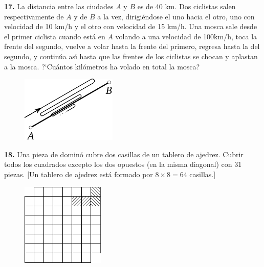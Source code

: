 \documentclass[12pt]{article}  %
\begin{document}
{\bf 17.} La distancia entre las ciudades $A$ y $B$ es de 40 km. Dos ciclistas salen respectivamente de $A$ y de $B$ 
a la vez, dirigi\'endose el uno hacia el otro, uno con velocidad de 10 km/h y el otro con velocidad de 15 km/h. 
Una mosca sale desde el primer ciclista cuando est\'a en $A$ volando a una velocidad de 100km/h, toca la frente del 
segundo, vuelve a volar hasta la frente del primero, regresa hasta la del segundo, y contin\'ua as\'{\i} hasta que las 
frentes de los ciclistas se chocan y aplastan a la mosca.
?`Cu\'antos kil\'ometros ha volado en total la mosca?
\begin{figure}[h]
\centering\includegraphics[scale=1]{taskbook-1}
\end{figure}


\medskip\noindent
{\bf 18.} Una pieza de domin\'o cubre dos casillas de un tablero de ajedrez. 
Cubrir todos los cuadrados excepto los dos opuestos (en la misma diagonal) con 31 piezas. [Un tablero de ajedrez est\'a formado por $8 \times 8 = 64$ casillas.]
\begin{figure}[h]
\centering
\footnotesize
\includegraphics[scale=1]{taskbook-2}
\end{figure}
\end{document}
